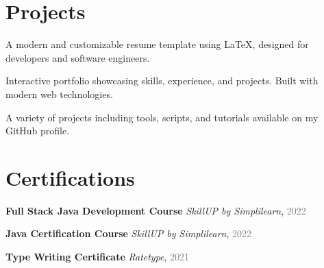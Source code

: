 \documentclass[]{azhagu-swe-resume-openfont}
\begin{document}
\begin{minipage}[t]{0.66\textwidth}

\section{Projects}

A modern and customizable resume template using LaTeX, designed for developers and software engineers.
\sectionsep

Interactive portfolio showcasing skills, experience, and projects. Built with modern web technologies.
\sectionsep

A variety of projects including tools, scripts, and tutorials available on my GitHub profile.

\section{Certifications}
\vspace{\topsep}

\begin{tightemize}
    \item \textbf{ Full Stack Java Development Course} \textit{SkillUP by Simplilearn}, \textcolor{gray}{2022}
    \item \textbf{Java Certification Course} \textit{SkillUP by Simplilearn}, \textcolor{gray}{2022}
    \item \textbf{Type Writing Certificate} \textit{Ratetype}, \textcolor{gray}{2021}
\end{tightemize}
\sectionsep


\end{minipage} 
\end{document}
